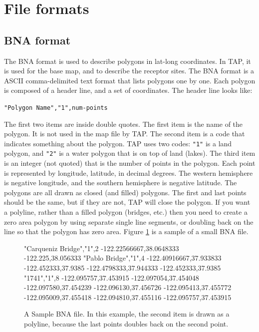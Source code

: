 \documentclass[12pt]{article}      %
\newcommand{\tap}{\textsf{TAP}\xspace}
\newcommand{\command}[1]{\texttt{#1}}
\newcommand{\fileline}[1]{\begin{flushleft}\texttt{#1}\end{flushleft}}
\begin{document}
\section{File formats}
\subsection{BNA format} \label{sec:BNA}
The BNA format is used to describe polygons in lat-long
coordinates.  In \tap, it is used for the base map, and to describe
the receptor sites.  The BNA format is a ASCII comma-delimited text
format that lists polygons one by one.  Each polygon is composed of a
header line, and a set of coordinates.  The header line looks like:
\fileline{"Polygon Name","1",num-points} The first two items are inside
double quotes.  The first item is the name of the polygon.  It is not
used in the map file by \tap.  The second item is a code that
indicates something about the polygon.  \tap uses two codes:
\command{"1"} is a land polygon, and \command{"2"} is a water polygon
that is on top of land (lakes).  The third item is an integer (not
quoted) that is the number of points in the polygon.  Each point is
represented by longitude, latitude, in decimal degrees.  The western
hemisphere is negative longitude, and the southern hemisphere is
negative latitude.  The polygons are all drawn as closed (and filled)
polygons. The first and last points should be the same, but if they are
not, \tap will close the polygon. If you want a polyline, rather than
a filled polygon (bridges, etc.) then you need to create a zero area
polygon by using separate single line segments, or doubling back on the
line so that the polygon has zero area. Figure \ref{fig:bna-example} is
a sample of a small BNA file.

\begin{figure}[tb!]
\centering
\begin{boxedverbatim}
"Carqueniz Bridge","1",2
-122.22566667,38.0648333
-122.225,38.056333
"Pablo Bridge","1",4
-122.40916667,37.933833
-122.452333,37.9385
-122.4798333,37.944333
-122.452333,37.9385
"1741","1",8
-122.095757,37.453915
-122.097054,37.454048
-122.097580,37.454239
-122.096130,37.456726
-122.095413,37.455772
-122.095009,37.455418
-122.094810,37.455116
-122.095757,37.453915
\end{boxedverbatim}
    \caption{A Sample BNA file. In this example, the second item is 
    drawn as a polyline, because the last points doubles back on the 
    second point.}
    \label{fig:bna-example}
\end{figure}
\end{document}
